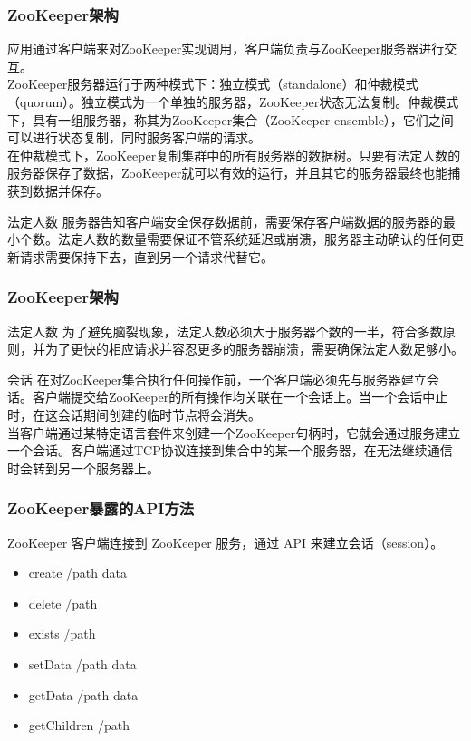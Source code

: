 \documentclass{beamer}
\begin{document}
\begin{frame}
	\frametitle{ZooKeeper架构}
	应用通过客户端来对ZooKeeper实现调用，客户端负责与ZooKeeper服务器进行交互。
	\\
	ZooKeeper服务器运行于两种模式下：独立模式（standalone）和仲裁模式（quorum）。独立模式为一个单独的服务器，ZooKeeper状态无法复制。仲裁模式下，具有一组服务器，称其为ZooKeeper集合（ZooKeeper ensemble），它们之间可以进行状态复制，同时服务客户端的请求。
	\\
	在仲裁模式下，ZooKeeper复制集群中的所有服务器的数据树。只要有法定人数的服务器保存了数据，ZooKeeper就可以有效的运行，并且其它的服务器最终也能捕获到数据并保存。
	\begin{block}{法定人数}
		服务器告知客户端安全保存数据前，需要保存客户端数据的服务器的最小个数。法定人数的数量需要保证不管系统延迟或崩溃，服务器主动确认的任何更新请求需要保持下去，直到另一个请求代替它。
	\end{block}
\end{frame}

\begin{frame}
	\frametitle{ZooKeeper架构}
	\begin{block}{法定人数}
		为了避免脑裂现象，法定人数必须大于服务器个数的一半，符合多数原则，并为了更快的相应请求并容忍更多的服务器崩溃，需要确保法定人数足够小。
	\end{block}
	\begin{block}{会话}
		在对ZooKeeper集合执行任何操作前，一个客户端必须先与服务器建立会话。客户端提交给ZooKeeper的所有操作均关联在一个会话上。当一个会话中止时，在这会话期间创建的临时节点将会消失。
		\\
		当客户端通过某特定语言套件来创建一个ZooKeeper句柄时，它就会通过服务建立一个会话。客户端通过TCP协议连接到集合中的某一个服务器，在无法继续通信时会转到另一个服务器上。
	\end{block}
\end{frame}

\begin{frame}
	\frametitle{ZooKeeper暴露的API方法}
	ZooKeeper 客户端连接到 ZooKeeper 服务，通过 API 来建立会话（session）。
	\begin{itemize}
		\item<1-> create /path data
		\item<2-> delete /path
		\item<3-> exists /path
		\item<4-> setData /path data
		\item<5-> getData /path data
		\item<6-> getChildren /path
	\end{itemize}
\end{frame}
\end{document}
